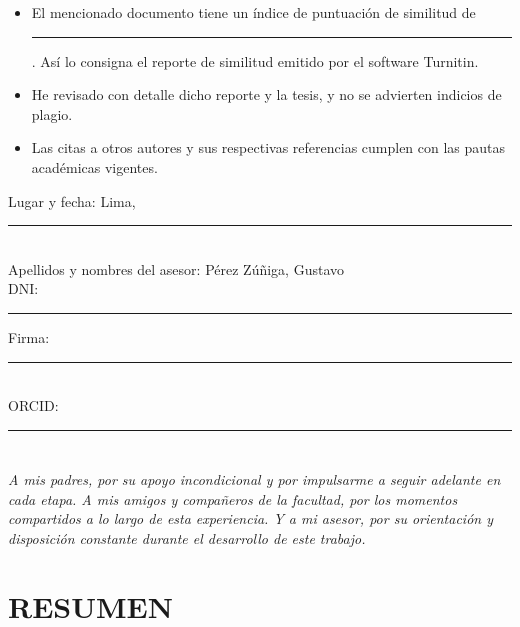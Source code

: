 \documentclass[12pt,a4paper,oneside]{report}
\numberwithin{figure}{chapter}
\numberwithin{table}{chapter}
\numberwithin{equation}{chapter}
\DeclareRobustCommand{\%}{\ifmmode\text{\char37\relax}\else\char37\relax\fi}%
\begin{document}
\begin{itemize}
\item El mencionado documento tiene un índice de puntuación de similitud de \rule{1.2cm}{0.4pt}\%. Así lo
consigna el reporte de similitud emitido por el software Turnitin.
\item He revisado con detalle dicho reporte y la tesis, y no se advierten indicios de plagio.
\item Las citas a otros autores y sus respectivas referencias cumplen con las pautas académicas vigentes.
\end{itemize}

\vspace{0.8cm}
\noindent Lugar y fecha: Lima, \rule{4cm}{0.4pt}\\[0.6cm]
\noindent Apellidos y nombres del asesor: Pérez Zúñiga, Gustavo\\[0.4cm]
\noindent DNI: \rule{3cm}{0.4pt} \hfill Firma: \rule{4cm}{0.4pt}\\[0.4cm]
\noindent ORCID: \rule{5cm}{0.4pt}

\chapter*{}
\thispagestyle{empty}
\vspace*{4cm}
\begin{flushright}
\begin{minipage}{0.62\linewidth}
\itshape
A mis padres, por su apoyo incondicional y por impulsarme a seguir adelante en cada etapa.
A mis amigos y compañeros de la facultad, por los momentos compartidos a lo largo de esta experiencia.
Y a mi asesor, por su orientación y disposición constante durante el desarrollo de este trabajo.
\end{minipage}
\end{flushright}

\clearpage
\pagestyle{fancy}
\chapter*{RESUMEN}\label{resumen}
\end{document}
